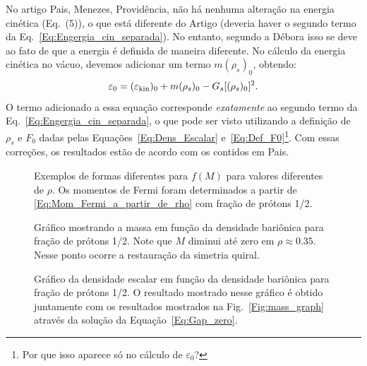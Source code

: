 No artigo Pais, Menezes, Providência, não há nenhuma alteração na energia cinética (Eq.~(5)), o que está diferente do Artigo\cite{PRC_68_035804_2003} (deveria haver o segundo termo da Eq.~\eqref{Eq:Engergia_cin_separada}). No entanto, segundo a Débora isso se deve ao fato de que a energia é definida de maneira diferente. No cálculo da energia cinética no vácuo, devemos adicionar um termo $m (\rho_s)_0$, obtendo:
\begin{equation}
	\varepsilon_0 = (\varepsilon_{\rm{kin}})_0 + m (\rho_s)_0 - G_s [(\rho_s)_0]^2.
\end{equation}
%
O termo adicionado a essa equação corresponde \emph{exatamente} ao segundo termo da Eq.~\eqref{Eq:Engergia_cin_separada}, o que pode ser visto utilizando a definição de $\rho_s$ e $F_0$ dadas pelas Equações~\eqref{Eq:Dens_Escalar} e~\eqref{Eq:Def_F0}\footnote{Por que isso aparece só no cálculo de $\varepsilon_0$?}. Com essas correções, os resultados estão de acordo com os contidos em Pais\cite{Pais}.

\vspace{1cm}

\begin{figure}
	
	\caption{Exemplos de formas diferentes para $f(M)$ para valores diferentes de $\rho$. Os momentos de Fermi foram determinados a partir de \eqref{Eq:Mom_Fermi_a_partir_de_rho} com fração de prótons 1/2. \protect}
	\label{Fig:Gap_zero_graph_eNJL1m}
\end{figure}

\begin{figure}
	
	\caption{Gráfico mostrando a massa em função da densidade bariônica para fração de prótons 1/2. Note que $M$ diminui até zero em $\rho \approx 0.35$. Nesse ponto ocorre a restauração da simetria quiral. \protect}
	\label{Fig:mass_graph_eNJL1m}
\end{figure}

\begin{figure}
	
	\caption{Gráfico da densidade escalar em função da densidade bariônica para fração de prótons 1/2. O resultado mostrado nesse gráfico é obtido juntamente com os resultados mostrados na Fig.~\ref{Fig:mass_graph} através da solução da Equação~\ref{Eq:Gap_zero}. \protect}
	\label{Fig:scalar_density_graph_eNJL1m}
\end{figure}

